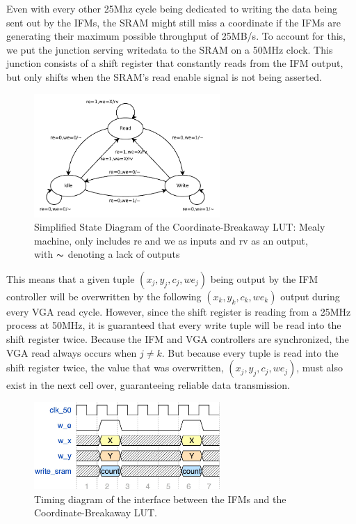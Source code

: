 \documentclass{article}
\begin{document}
Even with every other 25Mhz cycle being dedicated to writing the data being sent out by the IFMs, the SRAM might
still miss a coordinate if the IFMs are generating their maximum possible throughput of 25MB/s. To account for this, 
we put the junction serving writedata to the SRAM on a 50MHz clock. This junction consists of a shift register that 
constantly reads from the IFM output, but only shifts when the SRAM's read enable signal is not being asserted. 

\begin{figure}[H]
  \centering
    \includegraphics[width=200pt]{state_diagrams/clut.pdf}
  \caption{Simplified State Diagram of the Coordinate-Breakaway LUT:
    Mealy machine, only includes re and we as inputs and rv as an
    output, with $\thicksim$ denoting a lack of outputs}
\end{figure}

This means that a given tuple $(x_j, y_j, c_j, we_j)$ being output by the IFM controller will be overwritten by the 
following $(x_k, y_k, c_k, we_k)$ output during every VGA read cycle. However, since the shift register is reading from a 25MHz process at 50MHz, it is guaranteed that every write tuple will be read into the shift register twice. Because the IFM
and VGA controllers are synchronized, the VGA read always occurs when $j \neq k$. But because every tuple is read into the
shift register twice, the value that was overwritten, $(x_j, y_j, c_j, we_j)$, must also exist in the next cell over, 
guaranteeing reliable data transmission.

\begin{figure}[H]
  \centering
    \includegraphics[width=200pt]{timing_diagrams/ifm_clut.pdf}
  \caption{Timing diagram of the interface between the IFMs and the Coordinate-Breakaway LUT.}
\end{figure}
\end{document}
